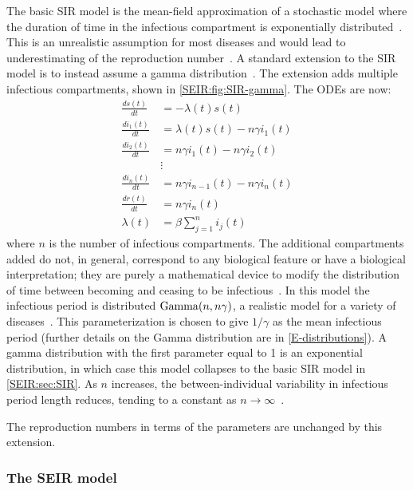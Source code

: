 \documentclass[thesis.tex]{subfiles}
\begin{document}
The basic SIR model is the mean-field approximation of a stochastic model where the duration of time in the infectious compartment is exponentially distributed~\autocite[96]{keelingModeling}.
This is an unrealistic assumption for most diseases and would lead to underestimating of the reproduction number~\autocite{lloydRealistic,wearingAppropriate}.
A standard extension to the SIR model is to instead assume a gamma distribution~\autocite[94]{keelingModeling,andersonSpread}.
The extension adds multiple infectious compartments, shown in \cref{SEIR:fig:SIR-gamma}.
The ODEs are now:
\begin{align}
\frac{ds(t)}{dt} &= -\lambda(t) s(t)\\
\frac{di_1(t)}{dt} &= \lambda(t) s(t) - n\gamma i_1(t) \\
\frac{di_2(t)}{dt} &= n\gamma i_1(t) - n \gamma i_2(t) \\
&\vdots \nonumber \\
\frac{di_n(t)}{dt} &= n\gamma i_{n-1}(t) - n \gamma i_n(t) \\
\frac{dr(t)}{dt} &= n\gamma i_n(t) \\
\lambda(t) &= \beta \sum_{j=1}^n i_j(t)
\end{align}
where $n$ is the number of infectious compartments.
The additional compartments added do not, in general, correspond to any biological feature or have a biological interpretation; they are purely a mathematical device to modify the distribution of time between becoming and ceasing to be infectious~\autocite{lloydRealistic}.
In this model the infectious period is distributed $\operatorname{Gamma}(n, n\gamma)$, a realistic model for a variety of diseases~\autocite{wearingAppropriate}.
This parameterization is chosen to give $1/\gamma$ as the mean infectious period (further details on the Gamma distribution are in \cref{E-distributions}).
A gamma distribution with the first parameter equal to 1 is an exponential distribution, in which case this model collapses to the basic SIR model in \cref{SEIR:sec:SIR}.
As $n$ increases, the between-individual variability in infectious period length reduces, tending to a constant as $n \to \infty$~\autocite{lloydRealistic}.

The reproduction numbers in terms of the parameters are unchanged by this extension.

\subsubsection{The SEIR model} \label{SEIR:sec:SEIR}
\end{document}
